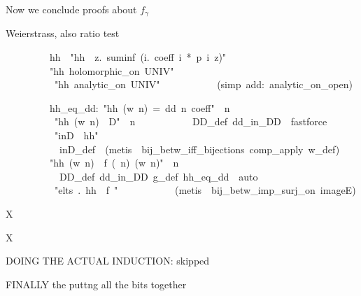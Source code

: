 \documentclass[runningheads]{llncs}
\begin{document}
Now we conclude proofs about $f_\gamma$

Weierstrass, also ratio test
\begin{isabelle}
\ \ \ \ \ \ \ \ \ hh\ \ "hh\ \isasymequiv \ \isasymlambda z.\ suminf\ (\isasymlambda i.\ coeff\ i\ *\ p\ i\ z)"\isanewline
\ \ \ \ \ \ \ \ \ "hh\ holomorphic\_on\ UNIV"\isanewline
\ \ \ \ \ \ \ \ \ \ \prf\isanewline
\ \ \ \ \ \ \ \ \ \ "hh\ analytic\_on\ UNIV"\isanewline
\ \ \ \ \ \ \ \ \ \ \ (simp\ add:\ analytic\_on\_open)
\end{isabelle}


\begin{isabelle}
\ \ \ \ \ \ \ \ \ hh\_eq\_dd:\ "hh\ (w\ n)\ =\ dd\ n\ coeff"\ \ n\isanewline
\ \ \ \ \ \ \ \ \ \ \prf\isanewline
\ \ \ \ \ \ \ \ \ \ "hh\ (w\ n)\ \isasymin \ D"\ \ n\isanewline
\ \ \ \ \ \ \ \ \ \ \ DD\_def\ dd\_in\_DD\ \ fastforce\isanewline
\ \ \ \ \ \ \ \ \ \ "inD\ \isasymgamma \ hh"\isanewline
\ \ \ \ \ \ \ \ \ \ \ inD\_def\ \ (metis\ \isasymeta \ bij\_betw\_iff\_bijections\ comp\_apply\ w\_def)\isanewline
\ \ \ \ \ \ \ \ \ "hh\ (w\ n)\ \isasymnoteq \ f\ (\isasymeta \ n)\ (w\ n)"\ \ n\isanewline
\ \ \ \ \ \ \ \ \ \ \ DD\_def\ dd\_in\_DD\ g\_def\ hh\_eq\_dd\ \ auto\isanewline
\ \ \ \ \ \ \ \ \ \ "\isasymforall \isasymbeta \isasymin elts\ \isasymgamma .\ hh\ \isasymnoteq \ f\ \isasymbeta "\isanewline
\ \ \ \ \ \ \ \ \ \ \ (metis\ \isasymeta \ bij\_betw\_imp\_surj\_on\ imageE)
\end{isabelle}


\begin{isabelle}
X
\end{isabelle}

\begin{isabelle}
X
\end{isabelle}


DOING THE ACTUAL INDUCTION: skipped

FINALLY the puttng all the bits together
\end{document}
